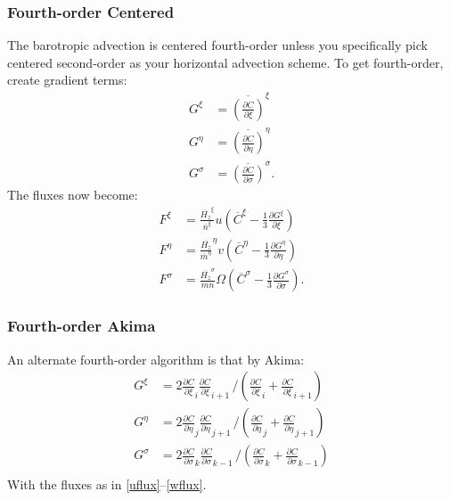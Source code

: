 \subsubsection{Fourth-order Centered}
The barotropic advection is centered fourth-order unless you
specifically pick centered second-order as your horizontal advection
scheme. To get fourth-order, create gradient terms:
\begin{align}
     G^{\xi} &= \overline{\left(\frac{\partial C}{\partial
            \xi}\right)}^\xi \\
     G^{\eta} &= \overline{\left(\frac{\partial C}{\partial
            \eta}\right)}^\eta \\
     G^{\sigma} &= \overline{\left(\frac{\partial C}{\partial
            \sigma}\right)}^\sigma  .
\end{align}
The fluxes now become:
\begin{align}
   F^\xi &= \frac{\overline{H_z}^\xi} {\overline{n}^\xi} u \left(
               \overline{C}^\xi -
           \frac{1}{3} \frac{\partial
               G^{\xi}}{\partial \xi} \right) \label{uflux} \\
   F^\eta &= \frac{\overline{H_z}}{\overline{m}^\eta} ^\eta v \left(
               \overline{C}^\eta-
           \frac{1}{3} \frac{\partial
               G^{\eta}}{\partial \eta} \right) \\
   F^\sigma &= \frac{\overline{H_z}^\sigma} {mn} \Omega \left(
               \overline{C}^\sigma -
           \frac{1}{3} \frac{\partial
               G^{\sigma}}{\partial \sigma} \right) \label{wflux} .
\end{align}

\subsubsection{Fourth-order Akima}
An alternate fourth-order algorithm is that by Akima:
\begin{align}
     G^{\xi} &= 2 {\frac{\partial C}{\partial \xi}_i
         \frac{\partial C}{\partial \xi}_{i+1}} \, \bigg/ \left(
         \frac{\partial C}{\partial \xi}_i +
          \frac{\partial C}{\partial \xi}_{i+1} \right) \\
     G^{\eta} &= 2 {\frac{\partial C}{\partial \eta}_j
         \frac{\partial C}{\partial \eta}_{j+1}} \, \bigg/ \left(
         \frac{\partial C}{\partial \eta}_j +
          \frac{\partial C}{\partial \eta}_{j+1} \right) \\
     G^{\sigma} &= 2 {\frac{\partial C}{\partial \sigma}_k
         \frac{\partial C}{\partial \sigma}_{k-1}} \, \bigg/ \left(
         \frac{\partial C}{\partial \sigma}_k +
          \frac{\partial C}{\partial \sigma}_{k-1} \right) \\
\end{align}
With the fluxes as in \ref{uflux}--\ref{wflux}.

